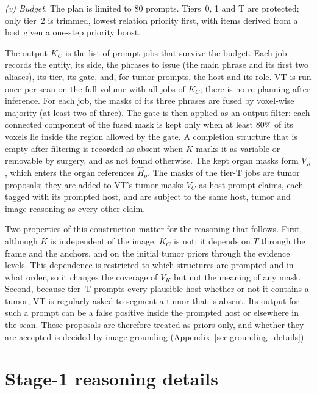 \documentclass[fleqn,10pt]{olplainarticle}
\begin{document}
\emph{(v) Budget.} The plan is limited to $80$ prompts. Tiers~0, 1 and T are protected; only tier~2 is trimmed, lowest relation
priority first, with items derived from a host given a one-step priority boost.

The output $K_C$ is the list of prompt jobs that survive the budget. Each job records the entity, its side, the phrases to
issue (the main phrase and its first two aliases), its tier, its gate, and, for tumor prompts, the host and its
role. VT is run once per scan on the full volume with all jobs of $K_C$; there is no re-planning after inference.
For each job, the masks of its three phrases are fused by voxel-wise majority (at least two of three). The gate is then
applied as an output filter: each connected component of the fused mask is kept only when at least $80\%$ of its
voxels lie inside the region allowed by the gate. A completion structure that is empty after filtering is recorded as
absent when $K$ marks it as variable or removable by surgery, and as not found otherwise. The kept organ masks form $V_K$, which enters the organ references
$\hat H_o$. The masks of the tier-T jobs are tumor proposals; they are added to VT's tumor masks $V_C$ as host-prompt
claims, each tagged with its prompted host, and are subject to the same host, tumor and image reasoning as every other claim.

Two properties of this construction matter for the reasoning that follows. First, although $K$ is independent of the
image, $K_C$ is not: it depends on $T$ through the frame and the anchors, and on the initial tumor priors through the
evidence levels. This dependence is restricted to which structures are prompted and in what order, so it changes the
coverage of $V_K$ but not the meaning of any mask. Second, because tier~T prompts every plausible host whether or not it
contains a tumor, VT is regularly asked to segment a tumor that is absent. Its output for such a prompt can be a false
positive inside the prompted host or elsewhere in the scan. These proposals are therefore treated as priors only, and
whether they are accepted is decided by image grounding
(Appendix~\ref{sec:grounding_details}).

\section{Stage-1 reasoning details}
\label{sec:reasoning_details}
\end{document}
